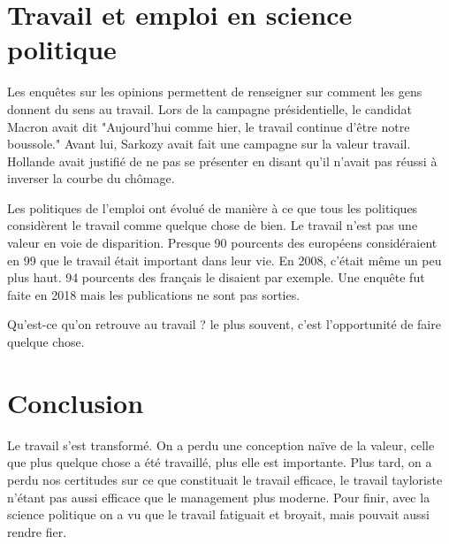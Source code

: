 \documentclass[a4paper,12pt]{book}
\begin{document}
\section{Travail et emploi en science politique}
Les enquêtes sur les opinions permettent de renseigner sur comment les gens donnent du sens au travail. Lors de la campagne présidentielle, le candidat Macron avait dit "Aujourd'hui comme hier, le travail continue d'être notre boussole." Avant lui, Sarkozy avait fait une campagne sur la valeur travail. Hollande avait justifié de ne pas se présenter en disant qu'il n'avait pas réussi à inverser la courbe du chômage.
\par Les politiques de l'emploi ont évolué de manière à ce que tous les politiques considèrent le travail comme quelque chose de bien. Le travail n'est pas une valeur en voie de disparition. Presque 90 pourcents des européens considéraient en 99 que le travail était important dans leur vie. En 2008, c'était même un peu plus haut. 94 pourcents des français le disaient par exemple. Une enquête fut faite en 2018 mais les publications ne sont pas sorties.
\par Qu'est-ce qu'on retrouve au travail ? le plus souvent, c'est l'opportunité de faire quelque chose.

\section{Conclusion}
Le travail s'est transformé. On a perdu une conception naïve de la valeur, celle que plus quelque chose a été travaillé, plus elle est importante. Plus tard, on a perdu nos certitudes sur ce que constituait le travail efficace, le travail tayloriste n'étant pas aussi efficace que le management plus moderne. Pour finir, avec la science politique on a vu que le travail fatiguait et broyait, mais pouvait aussi rendre fier.
\end{document}
